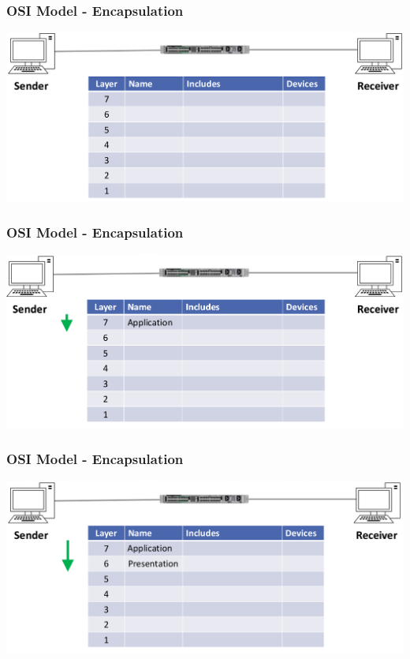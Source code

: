 \documentclass[pdflatex,compress]{beamer}
\begin{document}
\begin{frame}
	\frametitle{OSI Model - Encapsulation}
	\begin{center}
		\includegraphics[width=\linewidth]{img/img02}
	\end{center}
\end{frame}

\begin{frame}
	\frametitle{OSI Model - Encapsulation}
	\begin{center}
		\includegraphics[width=\linewidth]{img/img03}
	\end{center}
\end{frame}

\begin{frame}
	\frametitle{OSI Model - Encapsulation}
	\begin{center}
		\includegraphics[width=\linewidth]{img/img04}
	\end{center}
\end{frame}
\end{document}
